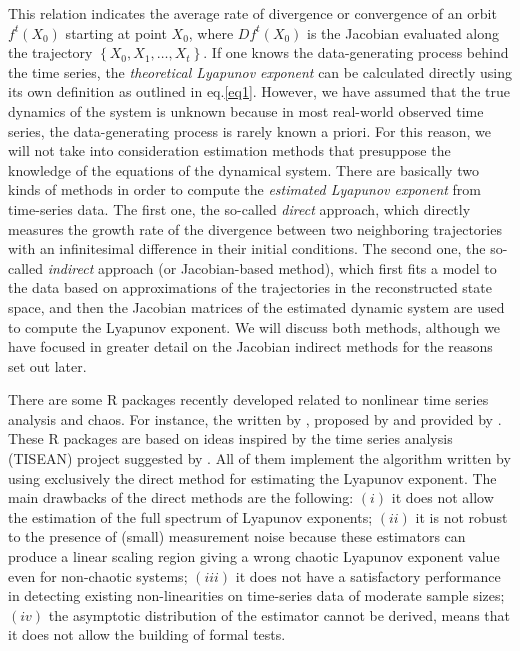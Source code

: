 This relation indicates the average rate of divergence or convergence of an orbit ${{f^t}\left( {{X_0}} \right)}$ starting at point $X_0$, where ${D{f^t}\left( {{X_0}} \right)}$ is the Jacobian evaluated along the trajectory $\left\{ {{X_0},{X_1}, \ldots ,{X_t}} \right\}$. If one knows the data-generating process behind the time series, the \textit{theoretical Lyapunov exponent} can be calculated directly using its own definition as outlined in eq.\ref{eq1}. However, we have assumed that the true dynamics of the system is unknown because in most real-world observed time series, the data-generating process is rarely known a priori. 
\newpage
For this reason, we will not take into consideration estimation methods that presuppose the knowledge of the equations of the dynamical system. There are basically two kinds of methods in order to compute the \textit{estimated Lyapunov exponent} from time-series data. The first one, the so-called \textit{direct} approach, which directly measures the growth rate of the divergence between two neighboring trajectories with an infinitesimal difference in their initial conditions. The second one, the so-called \textit{indirect} approach (or Jacobian-based method), which first fits a model to the data based on approximations of the trajectories in the reconstructed state space, and then the Jacobian matrices of the estimated dynamic system are used to compute the Lyapunov exponent. We will discuss both methods, although we have focused in greater detail on the Jacobian indirect methods for the reasons set out later.

There are some R packages recently developed related to nonlinear time series analysis and chaos. For instance, the  written by \cite{Fabio:2019},  proposed by \cite{Constantino:2019} and  provided by \cite{Wuertz:2017}. These R packages are based on ideas inspired by the time series analysis (TISEAN) project suggested by \cite{Hegger1999}. All of them implement the algorithm written by \cite{Kantz1994} using exclusively the direct method for estimating the Lyapunov exponent. The main drawbacks of the direct methods are the following: $\left( i \right)$ it does not allow the estimation of the full spectrum of Lyapunov exponents; $\left( ii \right)$ it is not robust to the presence of (small) measurement noise because these estimators can produce a linear scaling region giving a wrong chaotic Lyapunov exponent value even for non-chaotic systems; $\left( iii \right)$ it does not have a satisfactory performance in detecting existing non-linearities on time-series data of moderate sample sizes; $\left( iv \right)$ the asymptotic distribution of the estimator cannot be derived, means that it does not allow the building of formal tests.

